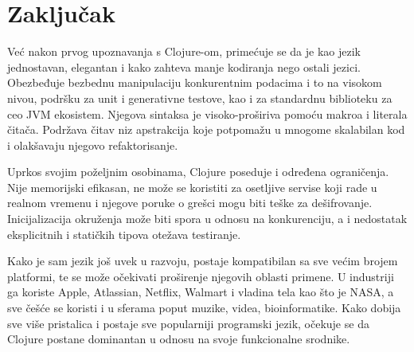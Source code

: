 \section{Zaključak}
\label{sec:zakljucak}

Već nakon prvog upoznavanja s Clojure-om, primećuje se da je kao jezik jednostavan, elegantan i kako zahteva manje kodiranja nego ostali jezici. Obezbeđuje bezbednu manipulaciju konkurentnim podacima i to na visokom nivou, podršku za unit i generativne testove, kao i za standardnu biblioteku za ceo JVM ekosistem. Njegova sintaksa je visoko-proširiva pomoću makroa i literala čitača. Podržava čitav niz apstrakcija koje potpomažu u mnogome skalabilan kod i olakšavaju njegovo refaktorisanje.

Uprkos svojim poželjnim osobinama, Clojure poseduje i određena ograničenja. Nije memorijski efikasan, ne može se koristiti za osetljive servise koji rade u realnom vremenu i njegove poruke o grešci mogu biti teške za dešifrovanje. Inicijalizacija okruženja može biti spora u odnosu na konkurenciju, a i nedostatak eksplicitnih i statičkih  tipova otežava testiranje.

Kako je sam jezik još uvek u razvoju, postaje kompatibilan sa sve većim brojem platformi, te se može  očekivati proširenje njegovih oblasti primene. U industriji ga koriste Apple, Atlassian, Netflix, Walmart i vladina tela kao što je NASA, a sve češće se koristi i u sferama poput muzike, videa, bioinformatike. Kako dobija sve više pristalica i postaje sve popularniji programski jezik, očekuje se da Clojure postane dominantan u odnosu na  svoje funkcionalne srodnike.